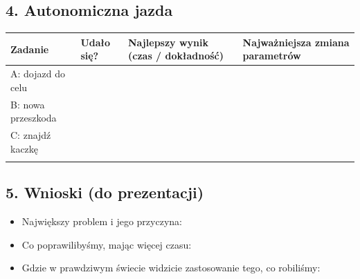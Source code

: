 \subsection{4. Autonomiczna jazda}\label{autonomiczna-jazda}

\par\noindent\begin{minipage}{\linewidth}
\begin{tabular}{@{}
  >{\raggedright\arraybackslash}p{}
  >{\raggedright\arraybackslash}p{}
  >{\raggedright\arraybackslash}p{}
  >{\raggedright\arraybackslash}p{}@{}}
\toprule\noalign{}
\begin{minipage}[b]{\linewidth}\raggedright
Zadanie
\end{minipage} & \begin{minipage}[b]{\linewidth}\raggedright
Udało się?
\end{minipage} & \begin{minipage}[b]{\linewidth}\raggedright
Najlepszy wynik (czas / dokładność)
\end{minipage} & \begin{minipage}[b]{\linewidth}\raggedright
Najważniejsza zmiana parametrów
\end{minipage} \\
\midrule\noalign{}
A: dojazd do celu & & & \\
B: nowa przeszkoda & & & \\
C: znajdź kaczkę & & & \\
\bottomrule\noalign{}
\end{tabular}
\end{minipage}\par\medskip

\subsection{5. Wnioski (do prezentacji)}\label{wnioski-do-prezentacji}

\begin{itemize}
\tightlist
\item
  Największy problem i jego przyczyna: 
\item
  Co poprawilibyśmy, mając więcej czasu: 
\item
  Gdzie w prawdziwym świecie widzicie zastosowanie tego, co robiliśmy: 
\end{itemize}
